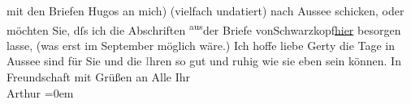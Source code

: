 \begin{ledgroupsized}[t]{13cm}
               mit den Briefen Hugos an mich) {\pb}(vielfach undatiert) nach Aussee schicken, oder möchten Sie, dſs \introOben{}ich\introOben{} die
               Abschriften \substVorne{}\textsuperscript{aus}\substDazwischen{}der Briefe von\substHinten{}{ }Schwarzkopf\uline{hier} besorgen lasse, (was erst im
                  September möglich wäre.)\pend
           \pstart
           Ich hoffe liebe Gerty die Tage in Aussee sind für
               Sie und die \textcolor{gray}{I}hren so gut und ruhig wie sie eben sein können. In
               Freundschaft mit Grüßen an Alle\pend
           \pstart
           Ihr{\\[\baselineskip]}\spacefill\mbox{Arthur}\pend
           \leftskip=0em{}\endnumbering{}\end{ledgroupsized}  \newcommand{\dateiname}{L02516}\newcommand{\titel}{Arthur Schnitzler an Gerty von Hofmannsthal, 2. 8. 1929}\newcommand{\editorInnen}{Martin Anton Müller und Gerd-Hermann Susen}
      